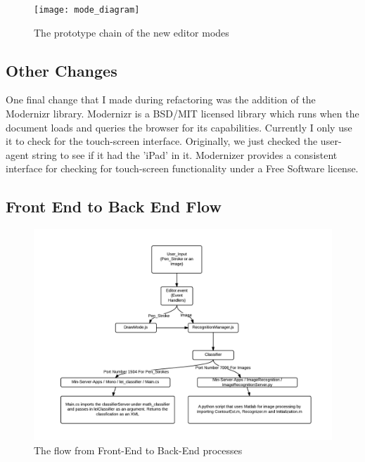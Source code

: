 \documentclass[letterpaper]{article}
\begin{document}
\begin{figure}[h]
    \begin{center}
        \texttt{[image: mode\_diagram]}
    \end{center}
    \caption{The prototype chain of the new editor modes}
    \label{fig:modes}
\end{figure}

\subsection*{Other Changes}

One final change that I made during refactoring was the addition of the
Modernizr library. Modernizr is a BSD/MIT licensed library which runs when the
document loads and queries the browser for its capabilities. Currently I only use it to
check for the touch-screen interface. Originally, we just checked the user-agent
string to see if it had the 'iPad' in it. Modernizer provides a consistent
interface for checking for touch-screen functionality under a Free Software
license.

\subsection*{Front End to Back End Flow}
\begin{figure}[H]
    \begin{center}
        \includegraphics[width=\textwidth]{FrontToBackEndFlow.png}
    \end{center}
    \caption{The flow from Front-End to Back-End processes}
    \label{fig:frontToBack}
\end{figure}
\end{document}
